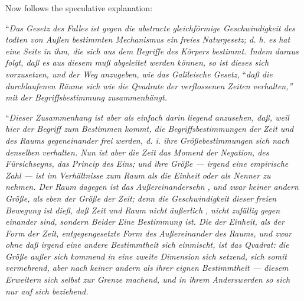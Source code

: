 \documentclass[12pt]{book}
\begin{document}
Now follows the speculative explanation:

``\textit{Das Gesetz des} \emph{Falles} \textit{ist gegen die abstracte gleichförmige Geschwindigkeit
des todten von Außen bestimmten Mechanismus ein} \emph{freies} \textit{Naturgesetz; d. h. es hat eine
Seite in ihm, die sich aus dem} \emph{Begriffe} \textit{des Körpers bestimmt. Indem daraus folgt, daß
es aus diesem muß abgeleitet werden können, so ist dieses sich vorzusetzen, und der Weg anzugeben, wie
das Galileische Gesetz,} ``\textit{daß die durchlaufenen Räume sich wie die} \emph{Qvadrate} \textit{der
verflossenen Zeiten verhalten,''} \textit{mit der Begriffsbestimmung zusammenhängt.}

``\textit{Dieser Zusammenhang ist aber als einfach darin liegend anzusehen, daß, weil hier der Begriff
zum Bestimmen kommt, die Begriffsbestimmungen der} \emph{Zeit} \textit{und des Raums gegeneinander}
\emph{frei} \textit{werden, d. i. ihre} \emph{Größebestimmungen} \textit{sich nach denselben verhalten.
Nun ist aber die Zeit das Moment der} \emph{Negation}\textit{, des Fürsichseyns, das Princip des Eins;
und ihre Größe --- irgend eine empirische Zahl --- ist im Verhältnisse zum Raum als die} \emph{Einheit}
\textit{oder als Nenner zu nehmen. Der} \emph{Raum} \textit{dagegen ist das} \emph{Außereinandersehn}
\textit{, und zwar} \emph{keiner andern Größe}\textit{, als eben der Größe der Zeit; denn die
Geschwindigkeit dieser} \emph{freien} \textit{Bewegung ist dieß, daß Zeit und Raum nicht} \emph{äußerlich}
\textit{, nicht zufällig
gegen einander sind, sondern Beider} \emph{Eine} \textit{Bestimmung ist. Die der} \emph{Einheit}\textit{,
als der Form der Zeit, entgegengesetzte Form des} \emph{Außereinander} \textit{des Raums, und zwar ohne
daß irgend eine andere Bestimmtheit sich einmischt, ist das} \emph{Qvadrat}\textit{: die Größe außer
sich kommend in eine zweite Dimension sich setzend, sich somit vermehrend, aber nach} \emph{keiner
andern als ihrer eignen} \textit{Bestimmtheit --- diesem Erweitern sich selbst zur Grenze machend, und
in ihrem Anderswerden so sich nur auf sich beziehend.}
\end{document}
